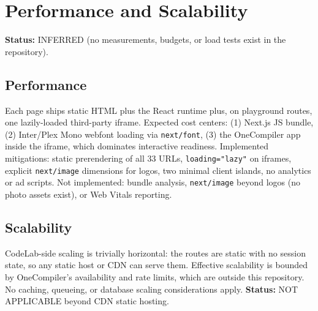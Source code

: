\section{Performance and Scalability}
\label{sec:performance}

\textbf{Status:} INFERRED (no measurements, budgets, or load tests exist in the repository).

\subsection{Performance}
Each page ships static HTML plus the React runtime plus, on playground routes, one lazily-loaded third-party iframe. Expected cost centers: (1) Next.js JS bundle, (2) Inter/Plex Mono webfont loading via \texttt{next/font}, (3) the OneCompiler app inside the iframe, which dominates interactive readiness. Implemented mitigations: static prerendering of all 33 URLs, \texttt{loading="lazy"} on iframes, explicit \texttt{next/image} dimensions for logos, two minimal client islands, no analytics or ad scripts. Not implemented: bundle analysis, \texttt{next/image} beyond logos (no photo assets exist), or Web Vitals reporting.

\subsection{Scalability}
CodeLab-side scaling is trivially horizontal: the routes are static with no session state, so any static host or CDN can serve them. Effective scalability is bounded by OneCompiler's availability and rate limits, which are outside this repository. No caching, queueing, or database scaling considerations apply. \textbf{Status:} NOT APPLICABLE beyond CDN static hosting.
